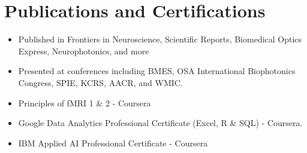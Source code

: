 \documentclass[letterpaper,11pt]{article}
\makeatletter
\newcommand{\resumeItem}[1]{
  \item\small{
    {#1 \vspace{-2pt}}
  }
}
\newcommand{\resumeSubheading}[4]{
  \vspace{-2pt}\item
    \begin{tabular*}{1.0\textwidth}[t]{l@{\extracolsep{\fill}}r}
      \textbf{#1} & \textbf{\small #2} \\
      \textit{\small#3} & \textit{\small #4} \\
    \end{tabular*}\vspace{-7pt}
}
\newcommand{\resumeSubHeadingListStart}{\begin{itemize}[leftmargin=0.0in, label={}]}
\newcommand{\resumeSubHeadingListEnd}{\end{itemize}}
\newcommand{\resumeItemListStart}{\begin{itemize}}
\newcommand{\resumeItemListEnd}{\end{itemize}\vspace{-5pt}}
\makeatother
\begin{document}

    
\section{Publications and Certifications}
            \resumeItemListStart
                \resumeItem{Published in Frontiers in Neuroscience, Scientific Reports, Biomedical Optics Express, Neurophotonics, and more}\\
                \resumeItem{Presented at conferences including BMES, OSA International Biophotonics Congress, SPIE, KCRS, AACR, and WMIC.}\\
                 \resumeItem{Principles of fMRI 1 \& 2 - Coursera}\\
                \resumeItem{Google Data Analytics Professional Certificate (Excel, R \& SQL) - Coursera.}\\
                \resumeItem{IBM Applied AI Professional Certificate - Coursera}
            \resumeItemListEnd
\end{document}
